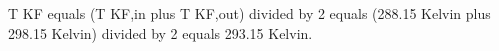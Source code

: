 T KF equals (T KF,in plus T KF,out) divided by 2  
equals (288.15 Kelvin plus 298.15 Kelvin) divided by 2  
equals 293.15 Kelvin.